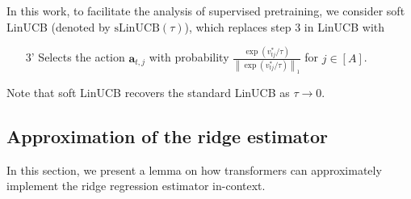 \documentclass[10pt]{article}
\newtheorem{theorem}{Theorem}
\newcommand{\eps}{\varepsilon}
\renewcommand{\bR}{\mathbf{R}}
\newcommand{\norm}[1]{\left\|{#1}\right\|} %
\newcommand{\lone}[1]{\norm{#1}_1} %
\newcommand{\<}{\left\langle}
\renewcommand{\>}{\right\rangle}
\newcommand{\DTF}{{\rm DTF}}
\newcommand{\nrmp}[1]{{\left|\!\left|\!\left|{#1}\right|\!\right|\!\right|}}
\newcommand{\sLinUCB}{{\mathrm{sLinUCB}}}
\newcommand{\temp}{{\tau}}
\newcommand{\tcO}{{\tilde{\mathcal O}}}
\def\btheta{{\boldsymbol \theta}}
\def\ba{{\mathbf a}}
\def\bw{{\mathbf w}}
\begin{document}
In this work, to facilitate the analysis of supervised pretraining, we consider soft LinUCB (denoted by $\sLinUCB(\temp)$), which replaces step 3 in LinUCB with
\begin{enumerate}
    \item [3'] Selects the action $\ba_{t,j}$ with probability $\frac{\exp(v^*_{tj}/\temp)}{\lone{\exp(v^*_{tj}/\temp)}}$ for $j\in[A]$. 
\end{enumerate} Note that soft LinUCB recovers the standard LinUCB as $\temp\to0$. 











\subsection{Approximation of the ridge estimator}\label{app:approx-ridge-estimator}
In this section, we present a lemma on how transformers can  approximately implement the ridge regression estimator in-context. 



\end{document}
